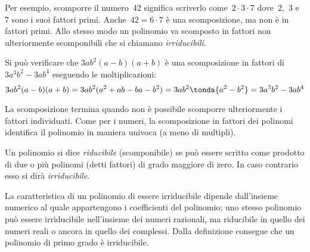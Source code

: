 \begin{minipage}{.4\textwidth}
\begin{inaccessibleblock}
 \begin{center}
% 
\scompfattnum
 \end{center}
\end{inaccessibleblock}
\end{minipage}
\begin{minipage}{.6\textwidth}
\begin{inaccessibleblock}
 \begin{center}
% 
\scompfattpol
 \end{center}
\end{inaccessibleblock}
\end{minipage}

Per esempio, scomporre il numero~\(42\) significa scriverlo 
come~\(2\cdot 3 \cdot 7\) dove~\(2\),~\(3\) e~\(7\) sono i suoi fattori primi.
Anche~\(42 = 6 \cdot 7\) è una scomposizione, ma non è in fattori primi. 
Allo stesso modo un polinomio va scomposto in fattori non ulteriormente
scomponibili che si chiamano \emph{irriducibili}. 

Si può verificare che \(3ab^{2}(a-b)(a+b)\) è una scomposizione in fattori di
\(3a^{3}b^{2}-3ab^{4}\) eseguendo le moltiplicazioni:
\[3ab^{2}(a-b)(a+b)=3ab^{2}(a^{2}+ab-ba-b^{2})=
  3ab^{2}\tonda{a^{2}-b^{2}}=3a^{3}b^{2}-3ab^{4}\]
  
La scomposizione termina quando non è possibile scomporre ulteriormente i 
fattori individuati.
Come per i numeri, la scomposizione in fattori dei polinomi identifica il 
polinomio in maniera univoca (a meno di multipli).

\begin{definizione}
Un polinomio si dice \emph{riducibile} (scomponibile) se può essere scritto 
come prodotto di due o più polinomi (detti fattori) di grado maggiore di zero.
In caso contrario esso si dirà \emph{irriducibile}.
\end{definizione}

La caratteristica di un polinomio di essere irriducibile dipende dall'insieme 
numerico al quale appartengono i coefficienti del polinomio;
uno stesso polinomio può essere irriducibile nell'insieme dei numeri 
razionali, ma riducibile in quello dei numeri reali o ancora in quello dei 
complessi.
Dalla definizione consegue che un polinomio di primo grado è irriducibile.

